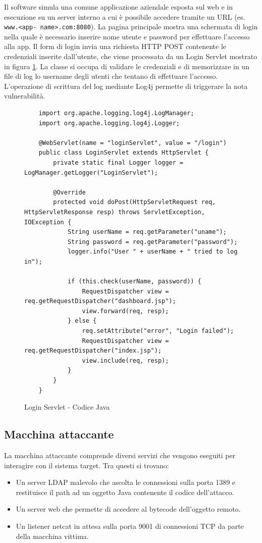 \documentclass[a4paper, 12pt]{article}
\begin{document}
Il software simula una comune applicazione aziendale esposta sul web e in esecuzione su un server interno a cui è possibile accedere tramite un URL (es. \texttt{www.<app- name>.com:8080}).
La pagina principale mostra una schermata di login nella quale è necessario inserire nome utente e password per effettuare l'accesso alla app.
Il form di login invia una richiesta HTTP POST contenente le credenziali inserite dall'utente, che viene processata da un Login Servlet mostrato in figura \ref{fig:loginservlet}. La classe si occupa di validare le credenziali e di memorizzare in un file di log lo username degli utenti che tentano di effettuare l'accesso.
L'operazione di scrittura del log mediante Log4j permette di triggerare la nota vulnerabilità.

\begin{figure}
    \centering
    \begin{lstlisting}
    import org.apache.logging.log4j.LogManager;
    import org.apache.logging.log4j.Logger;
    
    @WebServlet(name = "loginServlet", value = "/login")
    public class LoginServlet extends HttpServlet {
        private static final Logger logger = LogManager.getLogger("LoginServlet");
    
        @Override
        protected void doPost(HttpServletRequest req, HttpServletResponse resp) throws ServletException, IOException {
            String userName = req.getParameter("uname");
            String password = req.getParameter("password");
            logger.info("User " + userName + " tried to log in");
    
            if (this.check(userName, password)) {
                RequestDispatcher view = req.getRequestDispatcher("dashboard.jsp");
                view.forward(req, resp);
            } else {
                req.setAttribute("error", "Login failed");
                RequestDispatcher view = req.getRequestDispatcher("index.jsp");
                view.include(req, resp);
            }
        }
    }
\end{lstlisting}
    \caption{Login Servlet - Codice Java}
    \label{fig:loginservlet}
\end{figure}


\subsection{Macchina attaccante}
La macchina attaccante comprende diversi servizi che vengono eseguiti per interagire con il sistema target. Tra questi si trovano:
\begin{itemize}
    \item Un server LDAP malevolo che ascolta le connessioni sulla porta 1389 e restituisce il path ad un oggetto Java contenente il codice dell'attacco.
    \item Un server web che permette di accedere al bytecode dell'oggetto remoto.
    \item Un listener netcat in attesa sulla porta 9001 di connessioni TCP da parte della macchina vittima.
\end{itemize}
\end{document}
